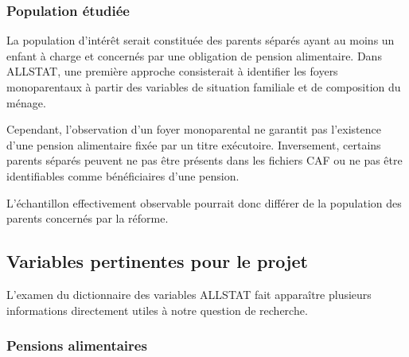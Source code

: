 \documentclass[11pt,a4paper]{article}
\begin{document}
\subsubsection{Population étudiée}

La population d'intérêt serait constituée
des parents séparés ayant au moins un enfant
à charge et concernés par une obligation
de pension alimentaire. Dans ALLSTAT, une première approche consisterait à identifier les foyers
monoparentaux à partir des variables
de situation familiale et de composition
du ménage.

Cependant, l'observation d'un foyer
monoparental ne garantit pas l'existence
d'une pension alimentaire fixée par
un titre exécutoire. Inversement, certains parents séparés
peuvent ne pas être présents dans les
fichiers CAF ou ne pas être identifiables
comme bénéficiaires d'une pension.

L'échantillon effectivement observable
pourrait donc différer de la population
des parents concernés par la réforme.

\subsection{Variables pertinentes pour le projet}

L'examen du dictionnaire des variables
ALLSTAT fait apparaître plusieurs
informations directement utiles
à notre question de recherche.

\subsubsection{Pensions alimentaires}
\end{document}

